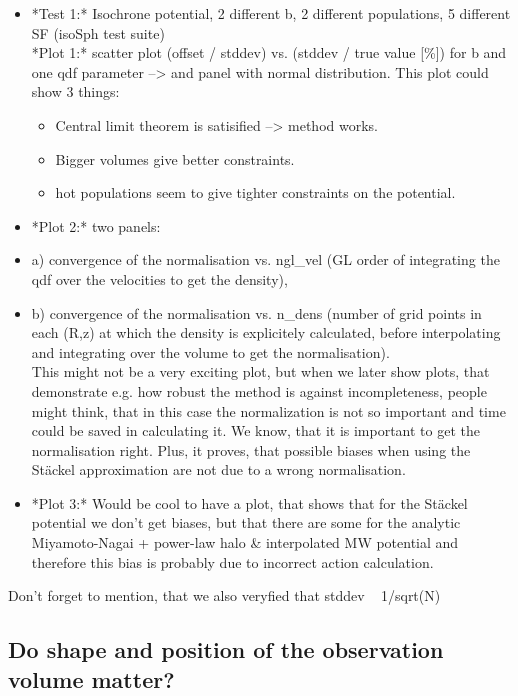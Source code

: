 \documentclass[12pt,preprint]{aastex}
\begin{document}
\begin{itemize}
\item *Test 1:* Isochrone potential, 2 different b, 2 different populations, 5 different SF (isoSph test suite) \\
*Plot 1:* scatter plot (offset / stddev) vs. (stddev / true value [\%]) for b and one qdf parameter --> and panel with normal distribution. This plot could show 3 things:
\begin{itemize}
\item Central limit theorem is satisified --> method works.
\item Bigger volumes give better constraints.
\item hot populations seem to give tighter constraints on the potential.
\end{itemize}
\item *Plot 2:* two panels: 
\item a) convergence of the normalisation vs. ngl\_vel (GL order of integrating the qdf over the velocities to get the density), 
\item b) convergence of the normalisation vs. n\_dens (number of grid points in each (R,z) at which the density is explicitely calculated, before interpolating and integrating over the volume to get the normalisation). \\ 
 This might not be a very exciting plot, but when we later show plots, that demonstrate e.g. how robust the method is against incompleteness, people might think, that in this case the normalization is not so important and time could be saved in calculating it. We know, that it is important to get the normalisation right. Plus, it proves, that possible biases when using the St\"ackel approximation are not due to a wrong normalisation.
\item *Plot 3:* Would be cool to have a plot, that shows that for the St\"ackel potential we don't get biases, but that there are some for the analytic Miyamoto-Nagai + power-law halo \& interpolated MW potential and therefore this bias is probably due to incorrect action calculation.
\end{itemize}
Don't forget to mention, that we also veryfied that stddev ~ 1/sqrt(N)

\subsection{Do shape and position of the observation volume matter?}
\end{document}
